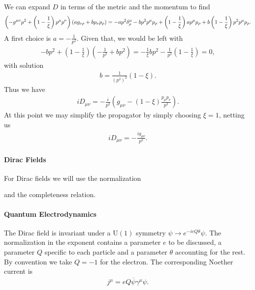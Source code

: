 We can expand $D$ in terms of the metric and the momentum to find
\begin{align*}
	\left(-g^{\mu\nu}p^{2} + \left(1 - \frac{1}{\xi}\right)p^{\mu}p^{\nu}\right)(ag_{\nu\rho} + bp_{\nu}p_{\rho}) = -ap^{2}\kdelta{\mu}{\rho} - bp^{2}p^{\mu}p_{\rho} + \left(1 - \frac{1}{\xi}\right)ap^{\mu}p_{\rho} + b\left(1 - \frac{1}{\xi}\right)p^{2}p^{\mu}p_{\rho}.
\end{align*}
A first choice is $a = -\frac{1}{p^{2}}$. Given that, we would be left with
\begin{align*}
	-bp^{2} + \left(1 - \frac{1}{\xi}\right)\left(-\frac{1}{p^{2}} + bp^{2}\right) = -\frac{1}{\xi}bp^{2} - \frac{1}{p^{2}}\left(1 - \frac{1}{\xi}\right) = 0,
\end{align*}
with solution
\begin{align*}
	b = \frac{1}{(p^{2})^{2}}(1 - \xi).
\end{align*}
Thus we have
\begin{align*}
	iD_{\mu\nu} = -\frac{i}{p^{2}}\left(g_{\mu\nu} - (1 - \xi)\frac{p_{\mu}p_{\nu}}{p^{2}}\right).
\end{align*}
At this point we may simplify the propagator by simply choosing $\xi = 1$, netting us
\begin{align*}
	iD_{\mu\nu} = -\frac{ig_{\mu\nu}}{p^{2}}.
\end{align*}

\paragraph{Dirac Fields}
For Dirac fields we will use the normalization

and the completeness relation.

\paragraph{Quantum Electrodynamics}
The Dirac field is invariant under a $\text{U}(1)$ symmetry $\psi\to e^{-ieQ\theta}\psi$. The normalization in the exponent contains a parameter $e$ to be discussed, a parameter $Q$ specific to each particle and a parameter $\theta$ accounting for the rest. By convention we take $Q = -1$ for the electron. The corresponding Noether current is
\begin{align*}
	j^{\mu} = eQ\overline{\psi}\gamma^{\mu}\psi.
\end{align*}

